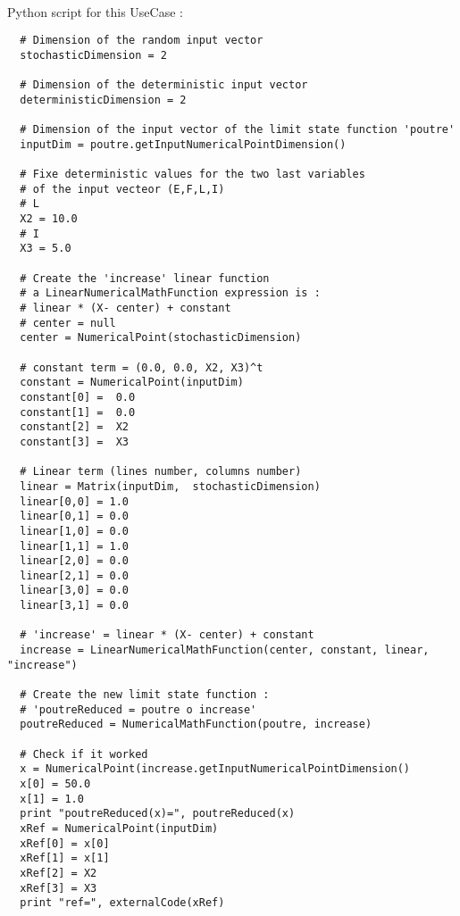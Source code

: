 \textspace\\
Python script for this UseCase :

\begin{lstlisting}
  # Dimension of the random input vector
  stochasticDimension = 2

  # Dimension of the deterministic input vector
  deterministicDimension = 2

  # Dimension of the input vector of the limit state function 'poutre'
  inputDim = poutre.getInputNumericalPointDimension()

  # Fixe deterministic values for the two last variables
  # of the input vecteor (E,F,L,I)
  # L
  X2 = 10.0
  # I
  X3 = 5.0

  # Create the 'increase' linear function
  # a LinearNumericalMathFunction expression is :
  # linear * (X- center) + constant
  # center = null
  center = NumericalPoint(stochasticDimension)

  # constant term = (0.0, 0.0, X2, X3)^t
  constant = NumericalPoint(inputDim)
  constant[0] =  0.0
  constant[1] =  0.0
  constant[2] =  X2
  constant[3] =  X3

  # Linear term (lines number, columns number)
  linear = Matrix(inputDim,  stochasticDimension)
  linear[0,0] = 1.0
  linear[0,1] = 0.0
  linear[1,0] = 0.0
  linear[1,1] = 1.0
  linear[2,0] = 0.0
  linear[2,1] = 0.0
  linear[3,0] = 0.0
  linear[3,1] = 0.0

  # 'increase' = linear * (X- center) + constant
  increase = LinearNumericalMathFunction(center, constant, linear, "increase")

  # Create the new limit state function :
  # 'poutreReduced = poutre o increase'
  poutreReduced = NumericalMathFunction(poutre, increase)

  # Check if it worked
  x = NumericalPoint(increase.getInputNumericalPointDimension()
  x[0] = 50.0
  x[1] = 1.0
  print "poutreReduced(x)=", poutreReduced(x)
  xRef = NumericalPoint(inputDim)
  xRef[0] = x[0]
  xRef[1] = x[1]
  xRef[2] = X2
  xRef[3] = X3
  print "ref=", externalCode(xRef)
\end{lstlisting}


